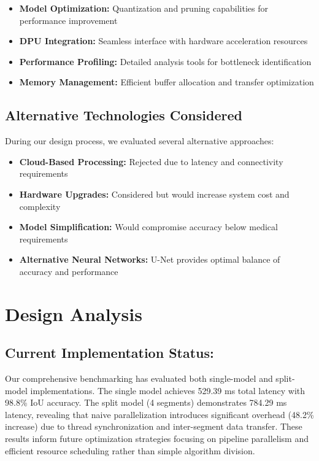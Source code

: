\begin{itemize}
\item \textbf{Model Optimization:} Quantization and pruning capabilities for performance improvement
\item \textbf{DPU Integration:} Seamless interface with hardware acceleration resources
\item \textbf{Performance Profiling:} Detailed analysis tools for bottleneck identification
\item \textbf{Memory Management:} Efficient buffer allocation and transfer optimization
\end{itemize}

\subsection{Alternative Technologies Considered}
During our design process, we evaluated several alternative approaches:

\begin{itemize}
\item \textbf{Cloud-Based Processing:} Rejected due to latency and connectivity requirements
\item \textbf{Hardware Upgrades:} Considered but would increase system cost and complexity
\item \textbf{Model Simplification:} Would compromise accuracy below medical requirements
\item \textbf{Alternative Neural Networks:} U-Net provides optimal balance of accuracy and performance
\end{itemize}

\section{Design Analysis}\label{sec:design-analysis}

\subsection{Current Implementation Status:}
Our comprehensive benchmarking has evaluated both single-model and split-model implementations. The single model achieves 529.39 ms total latency with 98.8\% IoU accuracy. The split model (4 segments) demonstrates 784.29 ms latency, revealing that naive parallelization introduces significant overhead (48.2\% increase) due to thread synchronization and inter-segment data transfer. These results inform future optimization strategies focusing on pipeline parallelism and efficient resource scheduling rather than simple algorithm division.

